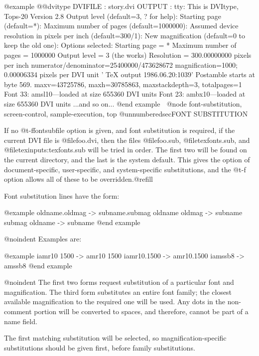 {@example
@@dvitype
DVIFILE    : story.dvi
OUTPUT     : tty:
This is DVItype, Tops-20 Version 2.8
Output level (default=3, ? for help):
Starting page (default=*):
Maximum number of pages (default=1000000):
Assumed device resolution in pixels per inch (default=300/1):
New magnification (default=0 to keep the old one):
Options selected:
  Starting page = *
  Maximum number of pages = 1000000
  Output level = 3 (the works)
  Resolution =  300.00000000 pixels per inch
numerator/denominator=25400000/473628672
magnification=1000;       0.00006334 pixels per DVI unit
' TeX output 1986.06.20:1039'
Postamble starts at byte 569.
maxv=43725786, maxh=30785863, maxstackdepth=3, totalpages=1
Font 33: amsl10---loaded at size 655360 DVI units
Font 23: ambx10---loaded at size 655360 DVI units
...and so on...
@end example

@node font-substitution, screen-control, sample-execution, top
@unnumberedsec{FONT SUBSTITUTION}

If no @t{-ffontsubfile} option is given, and font substitution is
required, if the current DVI file is @file{foo.dvi}, then the
files @file{foo.sub}, @file{texfonts.sub}, and
@file{texinputs:texfonts.sub} will be tried in order.  The first
two will be found on the current directory, and the last is the
system default.  This gives the option of document-specific,
user-specific, and system-specific substitutions, and the @t{-f}
option allows all of these to be overridden.@refill

Font substitution lines have the form:

@example
oldname.oldmag  ->      subname.submag  %
oldname oldmag  ->      subname submag  %
oldname         ->      subname         %
@end example

@noindent
Examples are:

@example
iamr10 1500     ->      amr10 1500      %
iamr10.1500     ->      amr10.1500      %
iamssb8         ->      amssb8          %
@end example

@noindent
The first two forms request substitution of a particular font and
magnification.  The third form substitutes an entire font family;
the closest available magnification to the required one will be
used.  Any dots in the non-comment portion will be converted to
spaces, and therefore, cannot be part of a name field.

The first matching substitution will be selected, so
magnification-specific substitutions should be given first,
before family substitutions.

}
